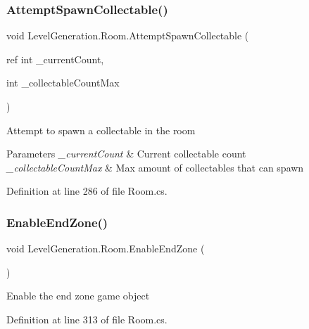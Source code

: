 \subsubsection{\texorpdfstring{Attempt\+Spawn\+Collectable()}{AttemptSpawnCollectable()}}
{\footnotesize\ttfamily void Level\+Generation.\+Room.\+Attempt\+Spawn\+Collectable (\begin{DoxyParamCaption}\item[{ref int}]{\+\_\+current\+Count,  }\item[{int}]{\+\_\+collectable\+Count\+Max }\end{DoxyParamCaption})}



Attempt to spawn a collectable in the room 


\begin{DoxyParams}{Parameters}
{\em \+\_\+current\+Count} & Current collectable count\\
\hline
{\em \+\_\+collectable\+Count\+Max} & Max amount of collectables that can spawn\\
\hline
\end{DoxyParams}


Definition at line 286 of file Room.\+cs.

\mbox{\label{class_level_generation_1_1_room_ae87c91e9280cfb6043c6d3bfe720d1ef}} 
\subsubsection{\texorpdfstring{Enable\+End\+Zone()}{EnableEndZone()}}
{\footnotesize\ttfamily void Level\+Generation.\+Room.\+Enable\+End\+Zone (\begin{DoxyParamCaption}{ }\end{DoxyParamCaption})}



Enable the end zone game object 



Definition at line 313 of file Room.\+cs.

\mbox{\label{class_level_generation_1_1_room_abfd82aaf18d4332f843635b9790af3d7}} 

